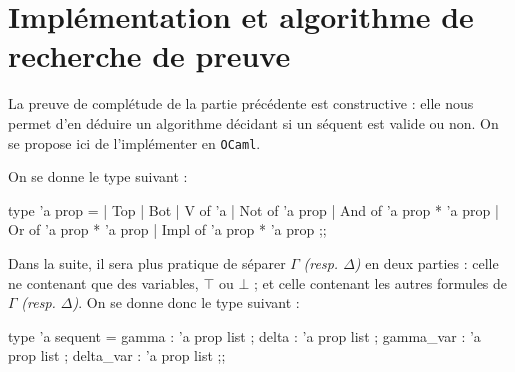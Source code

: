 \documentclass[a4paper,french,bookmarks]{article}
\begin{document}
    \section{Implémentation et algorithme de recherche de preuve}
    
    La preuve de complétude de la partie précédente est constructive : elle nous permet d'en déduire un algorithme décidant si un séquent est valide ou non. On se propose ici de l'implémenter en \texttt{OCaml}.
    
    On se donne le type  suivant :
    
    \begin{ocaml}
type 'a prop =
    | Top
    | Bot
    | V of 'a
    | Not of 'a prop
    | And of 'a prop * 'a prop
    | Or of 'a prop * 'a prop
    | Impl of 'a prop * 'a prop
;;
    \end{ocaml}
    
    Dans la suite, il sera plus pratique de séparer $\Gamma$ \emph{(resp. $\Delta$)} en deux parties : celle ne contenant que des variables, $\top$ ou $\bot$ ; et celle contenant les autres formules de $\Gamma$ \emph{(resp. $\Delta$)}. On se donne donc le type  suivant :
    
    \begin{ocaml}
type 'a sequent = {
    gamma : 'a prop list ;
    delta : 'a prop list ;
    gamma_var : 'a prop list ;
    delta_var : 'a prop list
}
;;
    \end{ocaml}
    
\end{document}
